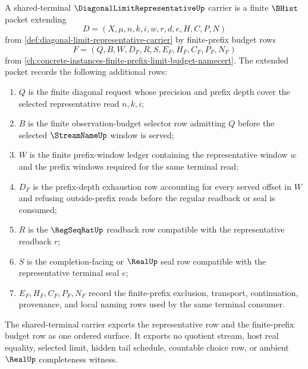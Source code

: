\begin{definition}
\label{def:diagonal-limit-representative-shared-terminal-carrier}
A shared-terminal $\DiagonalLimitRepresentativeUp$ carrier is a finite $\BHist$ packet extending
$$
D=(X,\mu,n,k,i,w,r,d,e,H,C,P,N)
$$
from \autoref{def:diagonal-limit-representative-carrier} by finite-prefix budget rows
$$
F=(Q,B,W,D_F,R,S,E_F,H_F,C_F,P_F,N_F)
$$
from \autoref{ch:concrete-instances-finite-prefix-limit-budget-namecert}. The extended packet records the following additional rows:
\begin{enumerate}
\item $Q$ is the finite diagonal request whose precision and prefix depth cover the selected representative read $n,k,i$;
\item $B$ is the finite observation-budget selector row admitting $Q$ before the selected $\StreamNameUp$ window is served;
\item $W$ is the finite prefix-window ledger containing the representative window $w$ and the prefix windows required for the same terminal read;
\item $D_F$ is the prefix-depth exhaustion row accounting for every served offset in $W$ and refusing outside-prefix reads before the regular readback or seal is consumed;
\item $R$ is the $\RegSeqRatUp$ readback row compatible with the representative readback $r$;
\item $S$ is the completion-facing or $\RealUp$ seal row compatible with the representative terminal seal $e$;
\item $E_F,H_F,C_F,P_F,N_F$ record the finite-prefix exclusion, transport, continuation, provenance, and local naming rows used by the same terminal consumer.
\end{enumerate}
The shared-terminal carrier exports the representative row and the finite-prefix budget row as one ordered surface. It exports no quotient stream, host real equality, selected limit, hidden tail schedule, countable choice row, or ambient $\RealUp$ completeness witness.
\end{definition}

